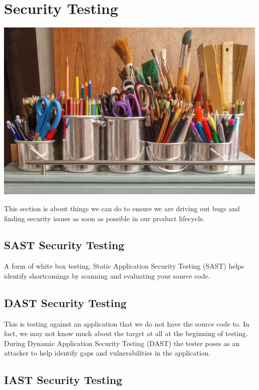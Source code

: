 \chapter{Security Testing}

\includegraphics[scale=0.85]{images/art-supplies-1324034.jpg}

This section is about things we can do to ensure we are driving out bugs and finding security issues as soon as possible in our
product lifecycle. 

\section{SAST Security Testing}

\justifying
A form of white box testing, Static Application Security Testing (SAST) helps identify
shortcomings by scanning and evaluating your source code.

\section{DAST Security Testing}

\justifying
This is testing against an application that we do not have the source code to. In fact, we may not know much
about the target at all at the beginning of testing. During Dynamic Application Security Testing (DAST)
the tester poses as an attacker to help identify gaps and vulnerabilities in the application.

\section{IAST Security Testing}

